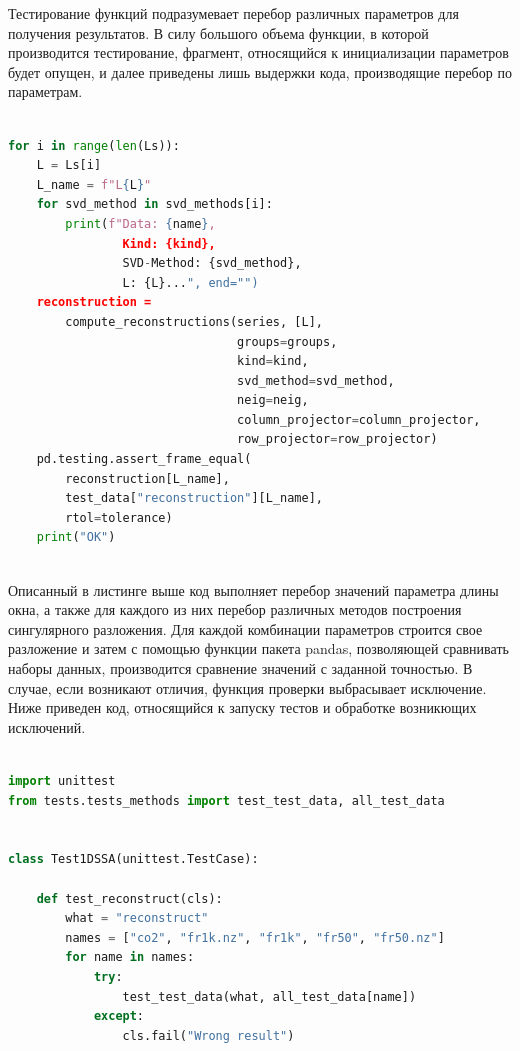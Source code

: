\documentclass[specialist,
			   substylefile = spbu_report.rtx,
			   subf,href,colorlinks=true, 12pt]{disser}
\begin{document}
Тестирование функций подразумевает перебор различных параметров для получения результатов. В силу большого объема функции, в которой производится тестирование, фрагмент, относящийся к инициализации параметров будет опущен, и далее приведены лишь выдержки кода, производящие перебор по параметрам.

\begin{lstlisting}[language=Python, caption=Перебор параметров восстановления и проверка результатов на правильность.]
	
for i in range(len(Ls)):
    L = Ls[i]
    L_name = f"L{L}"
    for svd_method in svd_methods[i]:
        print(f"Data: {name},
                Kind: {kind}, 
                SVD-Method: {svd_method},
                L: {L}...", end="")
    reconstruction = 
        compute_reconstructions(series, [L], 
                                groups=groups, 
                                kind=kind, 
                                svd_method=svd_method,
                                neig=neig, 
                                column_projector=column_projector,
                                row_projector=row_projector)
    pd.testing.assert_frame_equal(
        reconstruction[L_name], 
        test_data["reconstruction"][L_name],
        rtol=tolerance)
    print("OK")
	
\end{lstlisting}

Описанный в листинге выше код выполняет перебор значений параметра длины окна, а также для каждого из них перебор различных методов построения сингулярного разложения. Для каждой комбинации параметров строится свое разложение и затем с помощью функции пакета pandas, позволяющей сравнивать наборы данных, производится сравнение значений с заданной точностью. В случае, если возникают отличия, функция проверки выбрасывает исключение. Ниже приведен код, относящийся к запуску тестов и обработке возникющих исключений.

\begin{lstlisting}[language=Python, caption=Запуск тестов правильности восстановления временного ряда и обработка исключений.]

import unittest
from tests.tests_methods import test_test_data, all_test_data


class Test1DSSA(unittest.TestCase):

    def test_reconstruct(cls):
        what = "reconstruct"
        names = ["co2", "fr1k.nz", "fr1k", "fr50", "fr50.nz"]
        for name in names:
            try:
                test_test_data(what, all_test_data[name])
            except:
                cls.fail("Wrong result")
	
\end{lstlisting}
\end{document}
